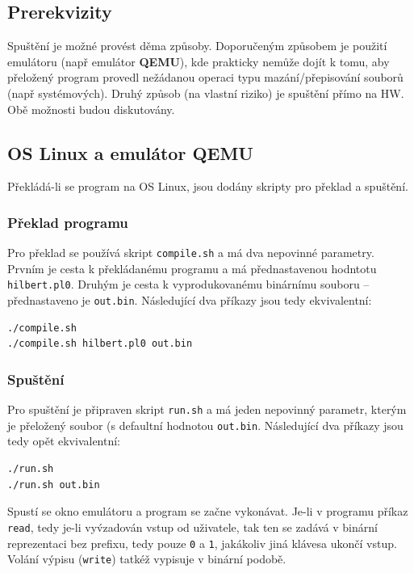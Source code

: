 \documentclass[a4paper]{article}
\begin{document}
\subsection{Prerekvizity}
Spu\v{s}t\v{e}n\'i je mo\v{z}n\'e prov\'est d\v{e}ma zp\r{u}soby.
Doporu\v{c}en\'ym zp\r{u}sobem je pou\v{z}it\'i emul\'atoru (nap\v{r} emul\'ator
\textbf{QEMU}), kde prakticky nem\r{u}\v{z}e doj\'it k tomu, aby
p\v{r}elo\v{z}en\'y program provedl ne\v{z}\'adanou operaci typu
maz\'an\'i/p\v{r}episov\'an\'i soubor\r{u} (nap\v{r} syst\'emov\'ych). Druh\'y
zp\r{u}sob (na vlastn\'i riziko) je spu\v{s}t\v{e}n\'i p\v{r}\'imo na HW.
Ob\v{e} mo\v{z}nosti budou diskutov\'any.
\subsection{OS Linux a emul\'ator QEMU}
P\v{r}ekl\'ad\'a-li se program na OS Linux, jsou dod\'any skripty pro
p\v{r}eklad a spu\v{s}t\v{e}n\'i.
\subsubsection{P\v{r}eklad programu}
Pro p\v{r}eklad se pou\v{z}\'iv\'a skript \texttt{compile.sh} a m\'a dva
nepovinn\'e parametry. Prvn\'im je cesta k p\v{r}ekl\'adan\'emu programu a
m\'a p\v{r}ednastavenou hodntotu \texttt{hilbert.pl0}. Druh\'ym je cesta
k vyprodukovan\'emu bin\'arn\'imu souboru -- p\v{r}ed\-nastaveno je
\texttt{out.bin}. N\'asleduj\'ic\'i dva p\v{r}\'ikazy jsou tedy ekvivalentn\'i:
\begin{verbatim}
./compile.sh
./compile.sh hilbert.pl0 out.bin
\end{verbatim}
\subsubsection{Spu\v{s}t\v{e}n\'i}
Pro spu\v{s}t\v{e}n\'i je p\v{r}ipraven skript \texttt{run.sh} a m\'a jeden
nepovinn\'y parametr, kter\'ym je p\v{r}elo\v{z}en\'y soubor (s defaultn\'i
hodnotou \texttt{out.bin}. N\'asleduj\'ic\'i dva p\v{r}\'ikazy jsou tedy
op\v{e}t ekvivalentn\'i:
\begin{verbatim}
./run.sh
./run.sh out.bin
\end{verbatim}
Spust\'i se okno emul\'atoru a program se za\v{c}ne vykon\'avat. Je-li
v programu p\v{r}\'ikaz \texttt{read}, tedy je-li vy\'v{z}adov\'an vstup
od u\v{z}ivatele, tak ten se zad\'av\'a v bin\'arn\'i reprezentaci
bez prefixu, tedy pouze \texttt{0} a \texttt{1}, jak\'akoliv jin\'a kl\'avesa
ukon\v{c}\'i vstup. Vol\'an\'i v\'ypisu (\texttt{write}) tatk\'e\v{z}
vypisuje v bin\'arn\'i podob\v{e}.
\end{document}
